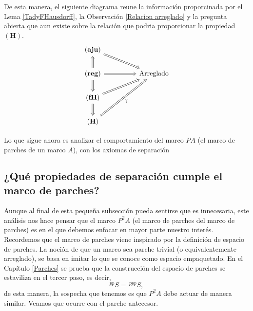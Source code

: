 De esta manera, el siguiente diagrama reune la información proporcinada por el Lema \ref{TadyFHausdorff}, la Observación \ref{Relacion arreglado} y la pregunta abierta que aun existe sobre la relación que podria proporcionar la propiedad $\mathbf{(H)}$.
\[\begin{tikzcd}
	{\mathbf{(aju)}} \\
	{\mathbf{(reg)}} && {\mbox{Arreglado}} \\
	{\mathbf{(fH)}} \\
	{\mathbf{(H)}}
	\arrow[Rightarrow, from=1-1, to=2-3]
	\arrow[Rightarrow, from=2-1, to=1-1]
	\arrow[Rightarrow, from=2-1, to=2-3]
	\arrow[Rightarrow, from=2-1, to=3-1]
	\arrow[Rightarrow, from=3-1, to=2-3]
	\arrow[Rightarrow, from=3-1, to=4-1]
	\arrow["{?}"', Rightarrow, from=4-1, to=2-3]
\end{tikzcd}\]

Lo que sigue ahora es analizar el comportamiento del marco $PA$ (el marco de parches de un marco $A$), con los axiomas de separación

\subsection{¿Qué propiedades de separación cumple el marco de parches?}\label{Parchesyseparación}

Aunque al final de esta pequeña subsección pueda sentirse que es innecesaria, este análisis nos hace pensar que el marco $P^2A$ (el marco de parches del marco de parches) es en el que debemos enfocar en mayor parte nuestro interés. Recordemos que el marco de parches viene inspirado por la definición de espacio de parches.
La noción de que un marco sea parche trivial (o equivalentemente arreglado), se basa en imitar lo que se conoce como espacio empaquetado. En el Capítulo \ref{Parches} se prueba que la construcción del espacio de parches se estaviliza en el tercer paso, es decir,
\[
^{pp}S=\,^{ppp}S,
\]
de esta manera, la sospecha que tenemos es que $P^2A$ debe actuar de manera similar. Veamos que ocurre con el parche antecesor.\\

